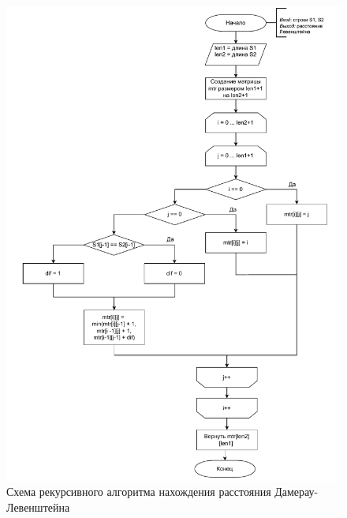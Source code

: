 \begin{figure}[h]
	\centering
	\includegraphics[height=0.9\textheight, page=3]{img/algoritms.pdf}
	\caption{Схема рекурсивного алгоритма нахождения расстояния Дамерау-Левенштейна}
	\label{fig:DLrec}
\end{figure}

\clearpage

